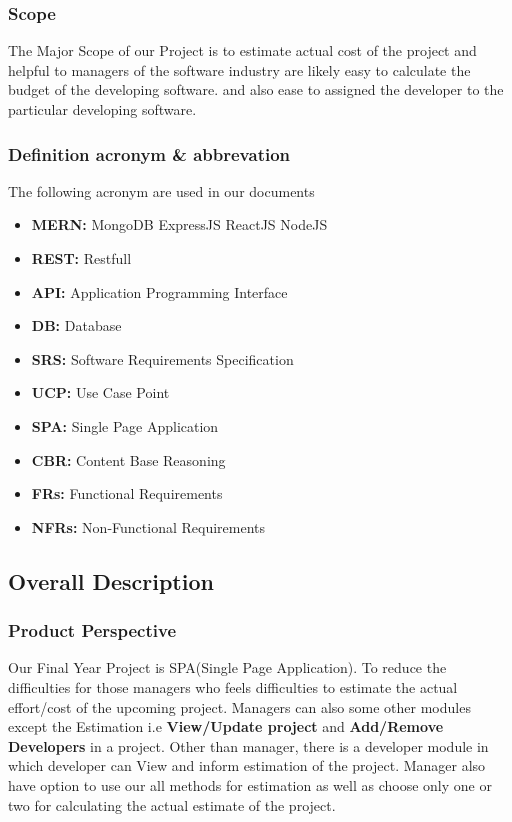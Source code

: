     \subsubsection[1pt]{Scope}
    The Major Scope of our Project is to estimate actual cost of the project and helpful to
    managers of the software industry are likely easy to calculate the budget of the developing software.
    and also ease to assigned the developer to the particular developing software. \\
    \subsubsection{Definition acronym \& abbrevation}
    The following acronym are used in our documents
    \begin{center}
        \begin{itemize}
            \item {\bfseries MERN:} MongoDB ExpressJS ReactJS NodeJS
            \item {\bfseries REST:} Restfull
            \item {\bfseries API:} Application Programming Interface
            \item {\bfseries DB:} Database
            \item {\bfseries SRS:} Software Requirements Specification
            \item {\bfseries UCP:} Use Case Point
            \item {\bfseries SPA:} Single Page Application
            \item {\bfseries CBR:} Content Base Reasoning
            \item {\bfseries FRs:} Functional Requirements
            \item {\bfseries NFRs:} Non-Functional Requirements
            \end{itemize}
    \end{center}
    
\subsection{Overall Description}
\subsubsection{Product Perspective}
Our Final Year Project is SPA(Single Page Application). To reduce the difficulties for those managers who feels 
difficulties to estimate the actual effort/cost of the upcoming project. Managers can also some other modules except
the Estimation i.e {\bfseries View/Update project} and {\bfseries Add/Remove Developers} in a project. Other than manager, there is a developer module in which developer 
can View and inform estimation of the project. Manager also have option to use our all methods for estimation as well as choose only one or two for calculating the actual estimate of the project.

